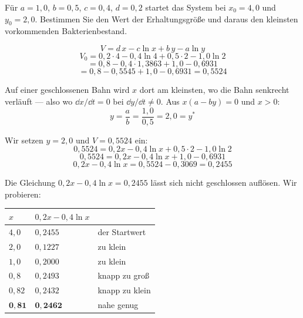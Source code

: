 \begin{aufgabe}
Für $a = 1{,}0$, $b = 0{,}5$, $c = 0{,}4$, $d = 0{,}2$ startet das System bei $x_0 = 4{,}0$ und $y_0 = 2{,}0$. Bestimmen Sie den Wert der Erhaltungsgröße und daraus den kleinsten vorkommenden Bakterienbestand.

\loesung
{}
\[ V = d\,x - c\ln x + b\,y - a\ln y \]
\[ V_0 = 0{,}2 \cdot 4 - 0{,}4\ln 4 + 0{,}5 \cdot 2 - 1{,}0\ln 2 \]
\[ = 0{,}8 - 0{,}4 \cdot 1{,}3863 + 1{,}0 - 0{,}6931 \]
\[ = 0{,}8 - 0{,}5545 + 1{,}0 - 0{,}6931 = 0{,}5524 \]

Auf einer geschlossenen Bahn wird $x$ dort am kleinsten, wo die Bahn senkrecht verläuft --- also wo $\dd x/\dd t = 0$ bei $\dd y/\dd t \neq 0$. Aus $x(a-by) = 0$ und $x > 0$:
\[ y = \frac{a}{b} = \frac{1{,}0}{0{,}5} = 2{,}0 = y^{*} \]

\begin{center}
\begin{minipage}{0.88\textwidth}
\end{minipage}
\end{center}

Wir setzen $y = 2{,}0$ und $V = 0{,}5524$ ein:
\[ 0{,}5524 = 0{,}2x - 0{,}4\ln x + 0{,}5 \cdot 2 - 1{,}0\ln 2 \]
\[ 0{,}5524 = 0{,}2x - 0{,}4\ln x + 1{,}0 - 0{,}6931 \]
\[ 0{,}2x - 0{,}4\ln x = 0{,}5524 - 0{,}3069 = 0{,}2455 \]

Die Gleichung $0{,}2x - 0{,}4\ln x = 0{,}2455$ lässt sich nicht geschlossen auflösen. Wir probieren:

\begin{center}
\renewcommand{\arraystretch}{1.42}
\begin{tabular}{@{}P{1.6cm}P{2.2cm}P{2.4cm}@{}}
\toprule
$x$ & $0{,}2x-0{,}4\ln x$ & \\
\midrule
$4{,}0$ & $0{,}2455$ & \textcolor{gruen}{der Startwert}\\
$2{,}0$ & $0{,}1227$ & zu klein\\
$1{,}0$ & $0{,}2000$ & zu klein\\
$0{,}8$ & $0{,}2493$ & knapp zu groß\\
$0{,}82$ & $0{,}2432$ & knapp zu klein\\
$\mathbf{0{,}81}$ & $\mathbf{0{,}2462}$ & \textcolor{gruen}{nahe genug}\\
\bottomrule
\end{tabular}
\end{center}


\end{aufgabe}
